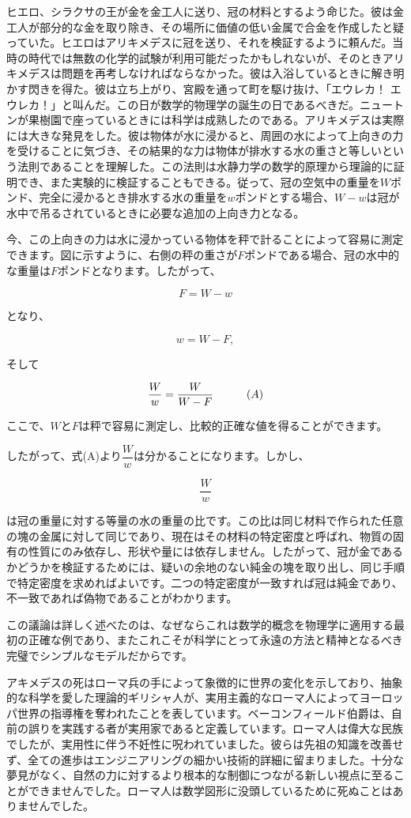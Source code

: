 \documentclass[a4paper,11pt,openany]{ltjsbook}
\providecommand{\Tag}[1]{\tag*{\quad\ensuremath{#1}}}
\begin{document}
ヒエロ、シラクサの王が金を金工人に送り、冠の材料とするよう命じた。彼は金工人が部分的な金を取り除き、その場所に価値の低い金属で合金を作成したと疑っていた。ヒエロはアリキメデスに冠を送り、それを検証するように頼んだ。当時の時代では無数の化学的試験が利用可能だったかもしれないが、そのときアリキメデスは問題を再考しなければならなかった。彼は入浴しているときに解き明かす閃きを得た。彼は立ち上がり、宮殿を通って町を駆け抜け、「エウレカ！ エウレカ！」と叫んだ。この日が数学的物理学の誕生の日であるべきだ。ニュートンが果樹園で座っているときには科学は成熟したのである。アリキメデスは実際には大きな発見をした。彼は物体が水に浸かると、周囲の水によって上向きの力を受けることに気づき、その結果的な力は物体が排水する水の重さと等しいという法則であることを理解した。この法則は水静力学の数学的原理から理論的に証明でき、また実験的に検証することもできる。従って、冠の空気中の重量を$W$ポンド、完全に浸かるとき排水する水の重量を$w$ポンドとする場合、$W - w$は冠が水中で吊るされているときに必要な追加の上向き力となる。

今、この上向きの力は水に浸かっている物体を秤で計ることによって容易に測定できます。図に示すように、右側の秤の重さが$F$ポンドである場合、冠の水中的な重量は$F$ポンドとなります。したがって、

\[
F = W - w
\]

となり、

\[
w = W - F,
\]

そして

\[
\frac{W}{w} = \frac{W}{W - F}
\Tag{(A)}
\]

ここで、$W$と$F$は秤で容易に測定し、比較的正確な値を得ることができます。

したがって、式(A)より$\dfrac{W}{w}$は分かることになります。しかし、

\[
\dfrac{W}{w}
\]

は冠の重量に対する等量の水の重量の比です。この比は同じ材料で作られた任意の塊の金属に対して同じであり、現在はその材料の特定密度と呼ばれ、物質の固有の性質にのみ依存し、形状や量には依存しません。したがって、冠が金であるかどうかを検証するためには、疑いの余地のない純金の塊を取り出し、同じ手順で特定密度を求めればよいです。二つの特定密度が一致すれば冠は純金であり、不一致であれば偽物であることがわかります。

この議論は詳しく述べたのは、なぜならこれは数学的概念を物理学に適用する最初の正確な例であり、またこれこそが科学にとって永遠の方法と精神となるべき完璧でシンプルなモデルだからです。

アキメデスの死はローマ兵の手によって象徴的に世界の変化を示しており、抽象的な科学を愛した理論的ギリシャ人が、実用主義的なローマ人によってヨーロッパ世界の指導権を奪われたことを表しています。ベーコンフィールド伯爵は、自前の誤りを実践する者が実用家であると定義しています。ローマ人は偉大な民族でしたが、実用性に伴う不妊性に呪われていました。彼らは先祖の知識を改善せず、全ての進歩はエンジニアリングの細かい技術的詳細に留まりました。十分な夢見がなく、自然の力に対するより根本的な制御につながる新しい視点に至ることができませんでした。ローマ人は数学図形に没頭しているために死ぬことはありませんでした。
\end{document}
